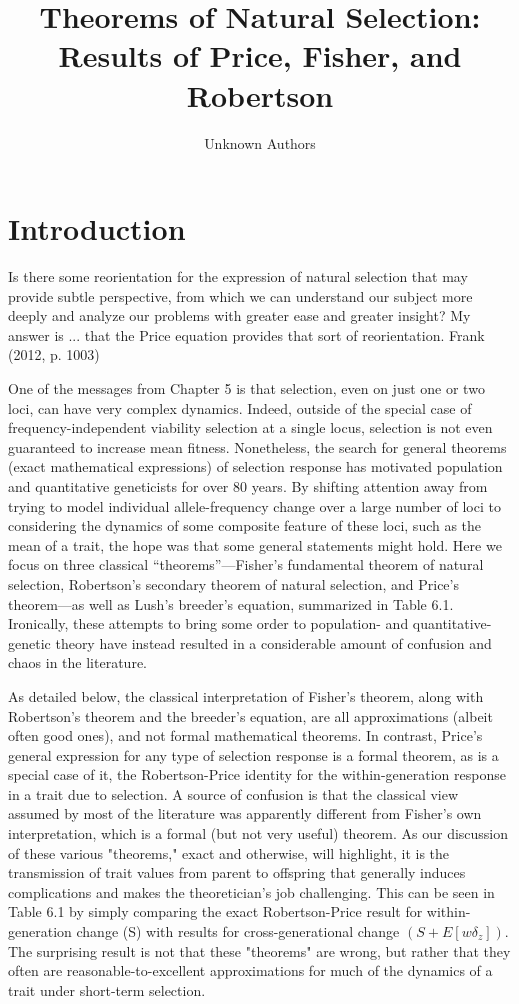 \documentclass{article}
\title{Theorems of Natural Selection: Results of Price, Fisher, and Robertson}
\author{Unknown Authors}
\date{}
\begin{document}
\maketitle

\begin{abstract}

\end{abstract}

\section{Introduction}
Is there some reorientation for the expression of natural selection that may provide subtle perspective, from which we can understand our subject more deeply and analyze our problems with greater ease and greater insight? My answer is ... that the Price equation provides that sort of reorientation. Frank (2012, p. 1003)

One of the messages from Chapter 5 is that selection, even on just one or two loci, can have very complex dynamics. Indeed, outside of the special case of frequency-independent viability selection at a single locus, selection is not even guaranteed to increase mean fitness. Nonetheless, the search for general theorems (exact mathematical expressions) of selection response has motivated population and quantitative geneticists for over 80 years. By shifting attention away from trying to model individual allele-frequency change over a large number of loci to considering the dynamics of some composite feature of these loci, such as the mean of a trait, the hope was that some general statements might hold. Here we focus on three classical “theorems”—Fisher’s fundamental theorem of natural selection, Robertson’s secondary theorem of natural selection, and Price’s theorem—as well as Lush’s breeder’s equation, summarized in Table 6.1. Ironically, these attempts to bring some order to population- and quantitative-genetic theory have instead resulted in a considerable amount of confusion and chaos in the literature.

As detailed below, the classical interpretation of Fisher's theorem, along with Robertson's theorem and the breeder's equation, are all approximations (albeit often good ones), and not formal mathematical theorems. In contrast, Price's general expression for any type of selection response is a formal theorem, as is a special case of it, the Robertson-Price identity for the within-generation response in a trait due to selection. A source of confusion is that the classical view assumed by most of the literature was apparently different from Fisher's own interpretation, which is a formal (but not very useful) theorem. As our discussion of these various "theorems," exact and otherwise, will highlight, it is the transmission of trait values from parent to offspring that generally induces complications and makes the theoretician's job challenging. This can be seen in Table 6.1 by simply comparing the exact Robertson-Price result for within-generation change (S) with results for cross-generational change  $ (S + E[w\delta_z]) $. The surprising result is not that these "theorems" are wrong, but rather that they often are reasonable-to-excellent approximations for much of the dynamics of a trait under short-term selection.
\end{document}
